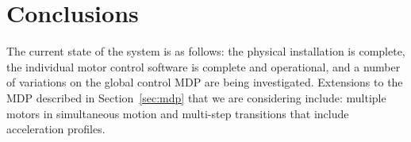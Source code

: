 \section{Conclusions}
\label{sec:conclude}

The current state of the system is as follows:
the physical installation is complete,
the individual motor control software is complete and operational,
and a number of variations on the global control MDP are being investigated.
Extensions to the MDP described in Section~\ref{sec:mdp} that we are
considering include: multiple motors in simultaneous motion and multi-step
transitions that include acceleration profiles.

